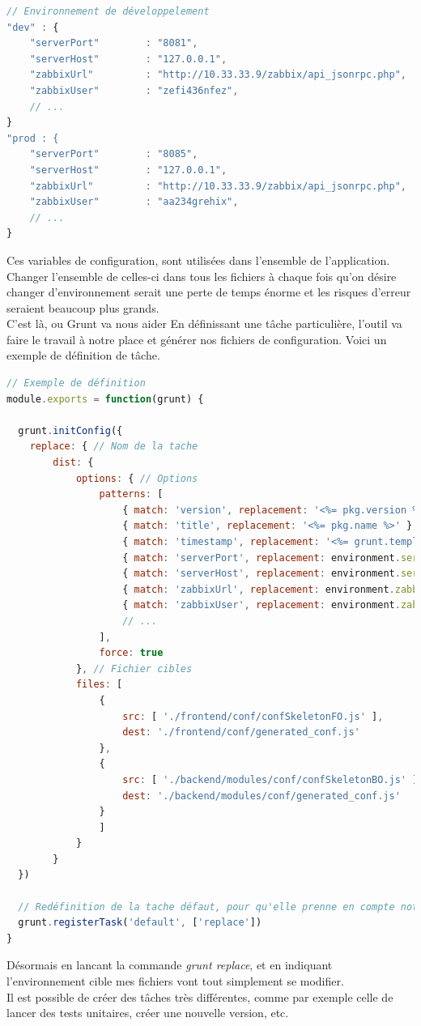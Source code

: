 \documentclass{report}
\newcommand{\jumpOne}{\\[1\baselineskip]}
\begin{document}
\begin{lstlisting}[language=javascript, caption=Ex de configuration en fonction d'evt]
// Environnement de développelement 
"dev" : {
    "serverPort"        : "8081",
    "serverHost"        : "127.0.0.1",
    "zabbixUrl"         : "http://10.33.33.9/zabbix/api_jsonrpc.php",
    "zabbixUser"        : "zefi436nfez",
    // ...
}
"prod : {
    "serverPort"        : "8085",
    "serverHost"        : "127.0.0.1",
    "zabbixUrl"         : "http://10.33.33.9/zabbix/api_jsonrpc.php",
    "zabbixUser"        : "aa234grehix",
    // ...
}
\end{lstlisting}

Ces variables de configuration, sont utilisées dans l'ensemble de l'application. 
Changer l'ensemble de celles-ci dans tous les fichiers à chaque fois qu'on désire changer d'environnement serait une perte de temps énorme et les risques d'erreur seraient beaucoup plus grands.
\jumpOne
C'est là, ou Grunt va nous aider
En définissant une tâche particulière, l'outil va faire le travail à notre place et générer nos fichiers de configuration. 
Voici un exemple de définition de tâche.
\begin{lstlisting}[language=javascript, caption=Tâche de concaténation des fichiers]
// Exemple de définition
module.exports = function(grunt) {

  grunt.initConfig({
    replace: { // Nom de la tache
        dist: {
            options: { // Options
                patterns: [
                    { match: 'version', replacement: '<%= pkg.version %>' },
                    { match: 'title', replacement: '<%= pkg.name %>' },
                    { match: 'timestamp', replacement: '<%= grunt.template.today() %>' },
                    { match: 'serverPort', replacement: environment.serverPort  },
                    { match: 'serverHost', replacement: environment.serverHost },
                    { match: 'zabbixUrl', replacement: environment.zabbixUrl },
                    { match: 'zabbixUser', replacement: environment.zabbixUser },
                    // ...
                ],
                force: true
            }, // Fichier cibles 
            files: [
                {
                    src: [ './frontend/conf/confSkeletonFO.js' ], 
                    dest: './frontend/conf/generated_conf.js'
                },
                {
                    src: [ './backend/modules/conf/confSkeletonBO.js' ], 
                    dest: './backend/modules/conf/generated_conf.js'
                }
                ]
            }
        }
  })

  // Redéfinition de la tache défaut, pour qu'elle prenne en compte notre replacement.
  grunt.registerTask('default', ['replace'])
}
\end{lstlisting}
Désormais en lancant la commande \emph{grunt replace}, et en indiquant l'environnement cible mes fichiers vont tout simplement se modifier. 
\jumpOne
Il est possible de créer des tâches très différentes, comme par exemple celle de lancer des tests unitaires, créer une nouvelle version, etc. 
\end{document}
